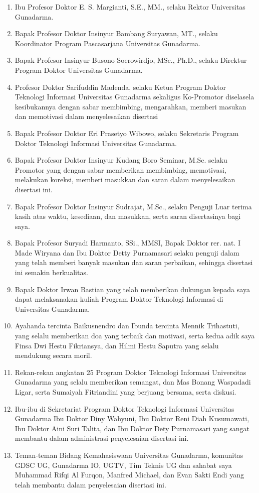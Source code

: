 \begin{enumerate}
\item Ibu Profesor Doktor E. S. Margianti, S.E., MM., selaku Rektor Universitas Gunadarma.
\item Bapak Profesor Doktor Insinyur Bambang Suryawan, MT., selaku Koordinator Program Pascasarjana Universitas Gunadarma.
\item Bapak Profesor Insinyur Busono Soerowirdjo, MSc., Ph.D., selaku Direktur Program Doktor Universitas Gunadarma.
\item Profesor Doktor Sarifuddin Madenda, selaku Ketua Program Doktor Teknologi Informasi Universitas Gunadarma sekaligus Ko-Promotor diselasela kesibukannya dengan sabar membimbing, mengarahkan, memberi masukan dan memotivasi dalam menyelesaikan disertasi
\item Bapak Profesor Doktor Eri Prasetyo Wibowo, selaku Sekretaris Program Doktor Teknologi Informasi Universitas Gunadarma.
\item Bapak Profesor Doktor Insinyur Kudang Boro Seminar, M.Sc. selaku Promotor yang dengan sabar memberikan membimbing, memotivasi, melakukan koreksi, memberi masukkan dan saran dalam menyelesaikan disertasi ini.
\item Bapak Profesor Doktor Insinyur Sudrajat, M.Sc., selaku Penguji Luar terima kasih atas waktu, kesediaan, dan masukkan, serta saran disertasinya bagi saya.
\item Bapak Profesor Suryadi Harmanto, SSi., MMSI, Bapak Doktor rer. nat. I Made Wiryana dan Ibu Doktor Detty Purnamasari selaku penguji dalam yang telah memberi banyak masukan dan saran perbaikan, sehingga disertasi ini semakin berkualitas.
\item Bapak Doktor Irwan Bastian yang telah memberikan dukungan kepada saya dapat melaksanakan kuliah Program Doktor Teknologi Informasi di Universitas Gunadarma.
\item Ayahanda tercinta Baikusnendro dan Ibunda tercinta Mennik Trihastuti, yang selalu memberikan doa yang terbaik dan motivasi, serta kedua adik saya Finsa Dwi Hestu Fikriansya, dan Hilmi Hestu Saputra yang selalu mendukung secara moril.
\item Rekan-rekan angkatan 25 Program Doktor Teknologi Informasi Universitas
Gunadarma yang selalu memberikan semangat, dan Mas Bonang Waspadadi Ligar, serta Sumaiyah Fitriandini yang berjuang bersama, serta diskusi.
\item Ibu-ibu di Sekretariat Program Doktor Teknologi Informasi Universitas Gunadarma Ibu Doktor Diny Wahyuni, Ibu Doktor Reni Diah Kusumawati, Ibu Doktor Aini Suri Talita, dan Ibu Doktor Dety Purnamasari yang sangat membantu dalam administrasi penyelesaian disertasi ini.
\item Teman-teman Bidang Kemahasiswaan Universitas Gunadarma, komunitas GDSC UG, Gunadarma IO, UGTV, Tim Teknis UG dan sahabat saya Muhammad Rifqi Al Furqon, Manfred Michael, dan Evan Sakti Endi yang telah membantu dalam penyelesaian disertasi ini.
\end{enumerate}

